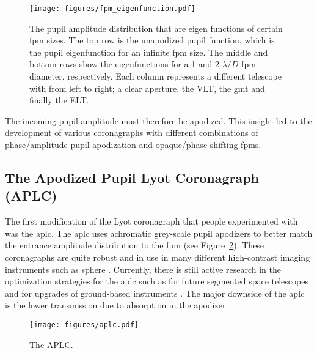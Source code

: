 \documentclass[letterpaper]{ar-1col}
\newcommand{\ld}{$\lambda/D$}
\begin{document}
\begin{figure}[ht]
  \centering
  \texttt{[image: figures/fpm\_eigenfunction.pdf]}
  \caption{The pupil amplitude distribution that are eigen functions of certain \ac{fpm} sizes. The top row is the unapodized pupil function, which is the pupil eigenfunction for an infinite \ac{fpm} size. The middle and bottom rows show the eigenfunctions for a 1 and 2 \ld{} \ac{fpm} diameter, respectively. Each column represents a different telescope with from left to right; a clear aperture, the VLT, the \ac{gmt} and finally the ELT.}
  \label{fig:fpm_eigenfunctions}
\end{figure}

The incoming pupil amplitude must therefore be apodized. This insight led to the development of various coronagraphs with different combinations of phase/amplitude pupil apodization and opaque/phase shifting \acp{fpm}.

\subsection{The Apodized Pupil Lyot Coronagraph (APLC)}

The first modification of the Lyot coronagraph that people experimented with was the \ac{aplc}.
%
The \ac{aplc} uses achromatic grey-scale pupil apodizers to better match the entrance amplitude distribution to the \ac{fpm} (see Figure~\ref{fig:coro_aplc}).
%
These coronagraphs are quite robust and in use in many different high-contrast imaging instruments such as \ac{sphere} \citep{beuzit2019sphere}.
%
Currently, there is still active research in the optimization strategies for the \ac{aplc} such as for future segmented space telescopes \citep{zimmerman2016lyot} and for upgrades of ground-based instruments \citep{nickson2022aplc}.
%
The major downside of the \ac{aplc} is the lower transmission due to absorption in the apodizer.

\begin{figure}[ht]
  \centering
  \texttt{[image: figures/aplc.pdf]}
  \caption{The APLC.}
  \label{fig:coro_aplc}
\end{figure}
\end{document}
